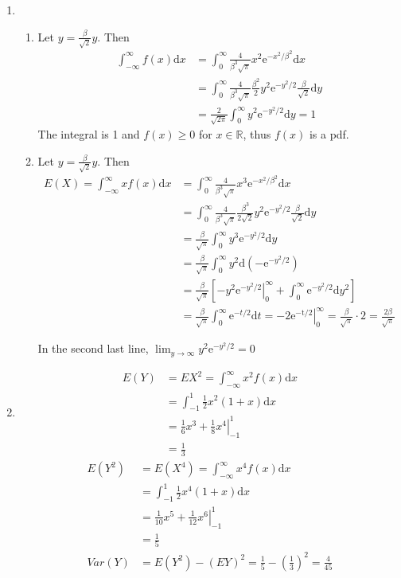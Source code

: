 \documentclass{article}
\begin{document}
\begin{enumerate}[leftmargin = 0 em, label = \arabic*., font = \bfseries]
\item \begin{enumerate}
	\item Let $y = \frac{\beta}{\sqrt{2}}y$. Then
	\begin{align*}
	\int_{-\infty}^\infty f(x) \mathrm{d}x &= \int_{0}^\infty \frac{4}{\beta^3 \sqrt{\pi}}x^2 \mathrm{e}^{-x^2 / \beta^2}  \mathrm{d}x\\
	&= \int_{0}^\infty \frac{4}{\beta^3 \sqrt{\pi}} \frac{\beta^2}{2}y^2 \mathrm{e}^{-y^2 /2}\frac{\beta}{\sqrt{2}} \mathrm{d}y\\
	& = \frac{2}{\sqrt{2 \pi}} \int_{0}^\infty y^2 \mathrm{e}^{- y^2 / 2} \mathrm{d}y = 1
	\end{align*}
	The integral is 1 and $f(x) \geq 0$ for $x\in \mathbb{R}$, thus $f(x)$ is a pdf.
	
	\item Let $y = \frac{\beta}{\sqrt{2}}y$. Then
	\begin{align*}
	E(X) = \int_{-\infty}^\infty x f(x) \mathrm{d}x &= \int_{0}^\infty \frac{4}{\beta^3 \sqrt{\pi}}x^3 \mathrm{e}^{-x^2 / \beta^2}  \mathrm{d}x\\
	 &= \int_{0}^\infty \frac{4}{\beta^3 \sqrt{\pi}} \frac{\beta^3}{2\sqrt{2}}y^2 \mathrm{e}^{-y^2 /2}\frac{\beta}{\sqrt{2}} \mathrm{d}y\\
	& = \frac{\beta}{\sqrt{\pi}} \int_{0}^\infty y^3 \mathrm{e}^{- y^2 / 2} \mathrm{d}y\\
	&= \frac{\beta}{\sqrt{\pi}} \int_{0}^\infty y^2 \mathrm{d}\left(- \mathrm{e}^{-y^2 /2}\right)\\
	&= \frac{\beta}{\sqrt{\pi}} \left[ \left.-y^2 \mathrm{e}^{-y^2 /2}\right|_{0}^\infty + \int_{0}^{\infty} \mathrm{e}^{-y^2 /2}\mathrm{d}{y^2}\right]\\
	& = \frac{\beta}{\sqrt{\pi}}\int_{0}^{\infty} \mathrm{e}^{-t/2}\mathrm{d}t = \left.-2\mathrm{e^{-t/2}}\right|_{0}^\infty = \frac{\beta}{\sqrt{\pi}} \cdot 2 = \frac{2 \beta }{\sqrt{\pi}}
	\end{align*}

	In the second last line, $\lim_{y\to \infty} y^2 \mathrm{e}^{-y^2 /2} = 0$
\end{enumerate}

\item \begin{align*}
E(Y) &= EX^2 = \int_{-\infty}^\infty x^2 f(x) \mathrm{d}x\\
&= \int_{-1}^1 \frac{1}{2} x^2(1+x) \mathrm{d}x\\
& = \left.\frac{1}{6} x^3 + \frac{1}{8}x^4 \right|_{-1}^{1}\\
& = \frac{1}{3}
\end{align*}
\begin{align*}
E(Y^2) &= E(X^4) = \int_{-\infty}^\infty x^4 f(x) \mathrm{d}x\\
&=\int_{-1}^1 \frac{1}{2}x^4(1+x)\mathrm{d}x\\
&= \left. \frac{1}{10}x^5 + \frac{1}{12}x^6 \right|_{-1}^1\\
&=\frac{1}{5}\\
Var(Y) &= E(Y^2) - (EY)^2 = \frac{1}{5} - (\frac{1}{3})^2 = \frac{4}{45}
\end{align*}


\end{enumerate}
\end{document}
